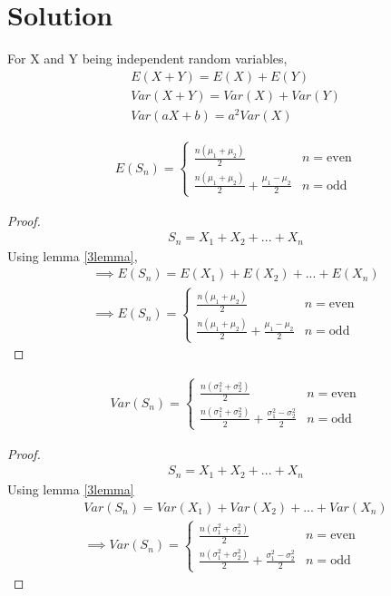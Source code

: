 \documentclass[journal,12pt,twocolumn]{IEEEtran}
\begin{document}
\section{Solution}
\begin{lemma}
\label{3lemma}
For X and Y being independent random variables,
\begin{align}
    E(X+Y)=E(X)+E(Y)\label{1}\\
    Var(X+Y)=Var(X)+Var(Y)\label{3}\\
    Var(aX+b)=a^2Var(X)\label{2}
    \end{align}
    \end{lemma}
\begin{corollary}
\label{eq2.0.4}
\begin{align}
E(S_n)=
    \begin{cases}
    \frac{n(\mu_1+\mu_2)}{2} & n=\mathrm{even}\\
    \frac{n(\mu_1+\mu_2)}{2}+\frac{\mu_1-\mu_2}{2} & n=\mathrm{odd}
    \end{cases}
\end{align}
\end{corollary}
\begin{proof}
\begin{align}
    S_n=X_1+X_2+...+X_n
\end{align}
Using lemma \eqref{3lemma},
\begin{align}
    \implies E(S_n)=E(X_1)+E(X_2)+...+E(X_n)\\
    \implies E(S_n)=
    \begin{cases}
    \frac{n(\mu_1+\mu_2)}{2} & n=\mathrm{even}\\
    \frac{n(\mu_1+\mu_2)}{2}+\frac{\mu_1-\mu_2}{2} & n=\mathrm{odd}
    \end{cases}
\end{align}
\end{proof}

\begin{corollary}
\begin{align}
Var(S_n)=
    \begin{cases}
    \frac{n(\sigma_1^2+\sigma_2^2)}{2} & n=\mathrm{even}\\
    \frac{n(\sigma_1^2+\sigma_2^2)}{2}+\frac{\sigma_1^2-\sigma_2^2}{2} & n=\mathrm{odd}
    \end{cases}
\end{align}
\end{corollary}
\begin{proof}
\begin{align}
S_n=X_1+X_2+...+X_n
\end{align}
Using lemma \eqref{3lemma}
\begin{align}
    Var(S_n)=Var(X_1)+Var(X_2)+...+Var(X_n)\\
    \implies Var(S_n)=
    \begin{cases}
    \frac{n(\sigma_1^2+\sigma_2^2)}{2} & n=\mathrm{even}\\
    \frac{n(\sigma_1^2+\sigma_2^2)}{2}+\frac{\sigma_1^2-\sigma_2^2}{2} & n=\mathrm{odd}
    \end{cases}
\end{align}
\end{proof}
\end{document}
